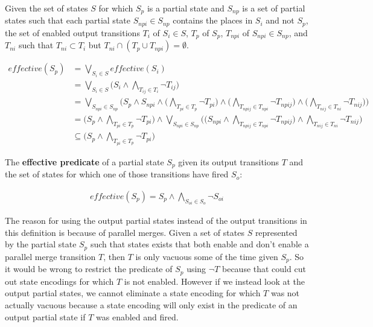 \begin{lemma}
Given the set of states $S$ for which $S_p$ is a partial state and $S_{np}$ is a set of partial states such that each partial state $S_{npi} \in S_{np}$ contains the places in $S_i$ and not $S_p$, the set of enabled output transitions $T_i$ of $S_i \in S$, $T_p$ of $S_p$, $T_{npi}$ of $S_{npi} \in S_{np}$, and $T_{ni}$ such that $T_{ni} \subset T_i$ but $T_{ni} \cap (T_p \cup T_{npi}) = \emptyset$.

\begin{align}
effective(S_p) &= \bigvee_{S_i \in S} effective(S_i) \\
&= \bigvee_{S_i \in S} \bigg( S_i \wedge \bigwedge_{T_{ij} \in T_i} \neg T_{ij} \bigg) \\
&= \bigvee_{S_{npi} \in S_{np}} \bigg( S_p \wedge S_{npi} \wedge \bigg( \bigwedge_{T_{pi} \in T_p} \neg T_{pi} \bigg) \wedge \bigg( \bigwedge_{T_{npij} \in T_{npi}} \neg T_{npij} \bigg) \wedge \bigg( \bigwedge_{T_{nij} \in T_{ni}} \neg T_{nij} \bigg) \bigg) \\
&= \bigg( S_p \wedge \bigwedge_{T_{pi} \in T_p} \neg T_{pi} \bigg) \wedge \bigvee_{S_{npi} \in S_{np}} \bigg( \bigg( S_{npi} \wedge \bigwedge_{T_{npij} \in T_{npi}} \neg T_{npij} \bigg) \wedge \bigwedge_{T_{nij} \in T_{ni}} \neg T_{nij} \bigg) \\
&\subseteq \bigg( S_p \wedge \bigwedge_{T_{pi} \in T_p} \neg T_{pi} \bigg)
\end{align}
\end{lemma}

\begin{definition}
The \textbf{effective predicate} of a partial state $S_p$ given its output transitions $T$ and the set of states for which one of those transitions have fired $S_o$:

\begin{align}
effective(S_p) = S_p \wedge \bigwedge_{S_{oi} \in S_o} \neg S_{oi}
\end{align}



\end{definition}

The reason for using the output partial states instead of the output transitions in this definition is because of parallel merges. Given a set of states $S$ represented by the partial state $S_p$ such that states exists that both enable and don't enable a parallel merge transition $T$, then $T$ is only vacuous some of the time given $S_p$. So it would be wrong to restrict the predicate of $S_p$ using $\neg T$ because that could cut out state encodings for which $T$ is not enabled. However if we instead look at the output partial states, we cannot eliminate a state encoding for which $T$ was not actually vacuous because a state encoding will only exist in the predicate of an output partial state if $T$ was enabled and fired.

